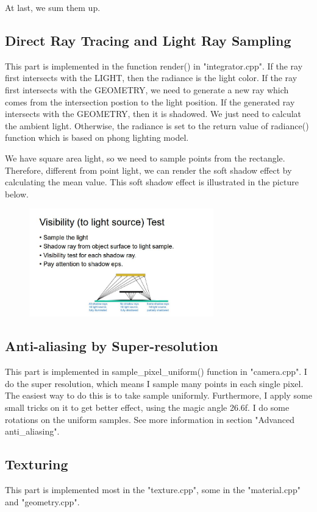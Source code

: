 \documentclass[acmtog]{acmart}
\begin{document}
At last, we sum them up.

\subsection{Direct Ray Tracing and Light Ray Sampling}
\quad This part is implemented in the function render() in "integrator.cpp".
If the ray first intersects with the LIGHT, then the radiance is the light color.
If the ray first intersects with the GEOMETRY, we need to generate a new ray which comes from the intersection postion to the light position. 
If the generated ray intersects with the GEOMETRY, then it is shadowed. We just need to calculat the ambient light. 
Otherwise, the radiance is set to the return value of radiance() function which is based on phong lighting model.


We have square area light, so we need to sample points from the rectangle. 
Therefore, different from point light, we can render the soft shadow effect by calculating the mean value. 
This soft shadow effect is illustrated in the picture below.
\begin{figure}[h]
	\centering
	{\includegraphics[width=8cm]{v1.JPG}}	
\end{figure}

\subsection{Anti-aliasing by Super-resolution}
\quad This part is implemented in sample\_pixel\_uniform() function in "camera.cpp".
I do the super resolution, which means I sample many points in each single pixel. The easiest way to do this is to take sample uniformly.
Furthermore, I apply some small tricks on it to get better effect, using the magic angle 26.6f. I do some rotations on the uniform samples. See more 
information in section "Advanced anti\_aliasing". 

\subsection{Texturing}
\quad This part is implemented most in the "texture.cpp", some in the "material.cpp" and "geometry.cpp".
\end{document}

